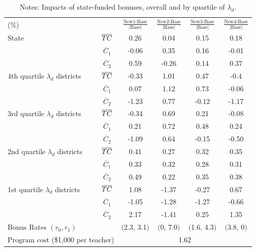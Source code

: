 \documentclass[notitlepage,12pt]{article}%
\begin{document}
\begin{table}[ptb]
\caption{State-Funded Bonuses}%
\label{tab:XXX1}
\begin{center}%
\begin{tabular}
[c]{lccccc}\hline\hline
(\%) &  & $\frac{\text{New1-Base}}{\left\vert \text{Base}\right\vert }$ &
$\frac{\text{New2-Base}}{\left\vert \text{Base}\right\vert }$ & $\frac
{\text{New3-Base}}{\left\vert \text{Base}\right\vert }$ & $\frac
{\text{New4-Base}}{\left\vert \text{Base}\right\vert }$\\
{\small State} & $\overline{{\small TC}}$ & 0.26 & 0.04 & 0.15 & 0.18\\
$\ \ \ \ \ \ \ $ & $\overline{C}_{1}$ & -0.06 & 0.35 & 0.16 & -0.01\\
$\ \ \ \ \ \ \ \ \ \ \ \ $ & $\overline{C}_{2}$ & 0.59 & -0.26 & 0.14 & 0.37\\
{\small 4th quartile }$\lambda_{d}$ {\small districts} & $\overline
{{\small TC}}$ & -0.33 & 1.01 & 0.47 & -0.4\\
& $\overline{C}_{1}$ & 0.07 & 1.12 & 0.73 & -0.06\\
& $\overline{C}_{2}$ & -1.23 & 0.77 & -0.12 & -1.17\\
{\small 3rd quartile }$\lambda_{d}$ {\small districts} & $\overline
{{\small TC}}$ & -0.34 & 0.69 & 0.21 & -0.08\\
& $\overline{C}_{1}$ & 0.21 & 0.72 & 0.48 & 0.24\\
& $\overline{C}_{2}$ & -1.09 & 0.64 & -0.15 & -0.50\\
{\small 2nd quartile }$\lambda_{d}$ {\small districts} & $\overline
{{\small TC}}$ & 0.41 & 0.27 & 0.32 & 0.35\\
& $\overline{C}_{1}$ & 0.33 & 0.32 & 0.28 & 0.31\\
& $\overline{C}_{2}$ & 0.49 & 0.22 & 0.35 & 0.38\\
{\small 1st quartile }$\lambda_{d}$ {\small districts} & $\overline
{{\small TC}}$ & 1.08 & -1.37 & -0.27 & 0.67\\
& $\overline{C}_{1}$ & -1.05 & -1.28 & -1.27 & -0.66\\
& $\overline{C}_{2}$ & 2.17 & -1.41 & 0.25 & 1.35\\\hline
\multicolumn{2}{l}{Bonus Rates $\left(  r_{0},r_{1}\right)  $} & $($2.3,
3.1$)$ & $($0, 7.0$)$ & $($1.6, 4.3$)$ & $($3.8, 0$)$\\
\multicolumn{2}{l}{Pr$\text{ogram cost }$(\$1,000 per teacher)} &
\multicolumn{4}{c}{1.62}\\\hline\hline
\end{tabular}
\caption*{{\footnotesize Notes: Impacts of state-funded bonuses, overall and by quartile of $\lambda_d$.}}
\end{center}
\end{table}
\end{document}
